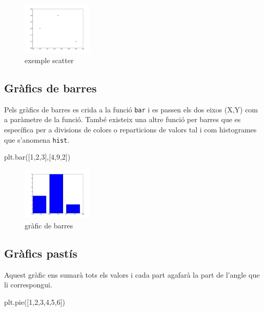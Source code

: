 \begin{figure}[!h]
    \begin{centering}
    \includegraphics[width=0.3\textwidth]{img/ex03.png}
    \caption{exemple scatter}
    \label{fig:figex03}
    \end{centering}
\end{figure}

\subsection{Gràfics de barres}
Pels gràfics de barres es crida a la funció {\tt bar} i es passen els dos eixos (X,Y) com a paràmetre de la funció. També existeix una altre funció per barres que es específica per a divisions de colors o reparticions de valors tal i com histogrames que s'anomena {\tt hist}.

\begin{tip}[caption=Gràfic de barres]
plt.bar([1,2,3],[4,9,2])
\end{tip}


\begin{figure}[!h]
    \begin{centering}
    \includegraphics[width=0.3\textwidth]{img/ex04.png}
    \caption{gràfic de barres}
    \label{fig:figex04}
    \end{centering}
\end{figure}
\subsection{Gràfics pastís}
Aquest gràfic ens sumarà tots els valors i cada part agafarà la part de l'angle que li correspongui.


\begin{tip}[caption=Gràfic pastís]
plt.pie([1,2,3,4,5,6])
\end{tip}


